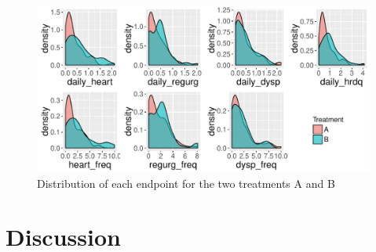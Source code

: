 \documentclass[11pt]{article}
\begin{document}
\begin{figure}
\centering
\includegraphics[width = \textwidth]{fig/clinical_distr}
\caption{Distribution of each endpoint for the two treatments A and B}
\label{fig:clinical_distr}
\end{figure}


\begin{center}

\end{center}

\section{Discussion}
\end{document}
